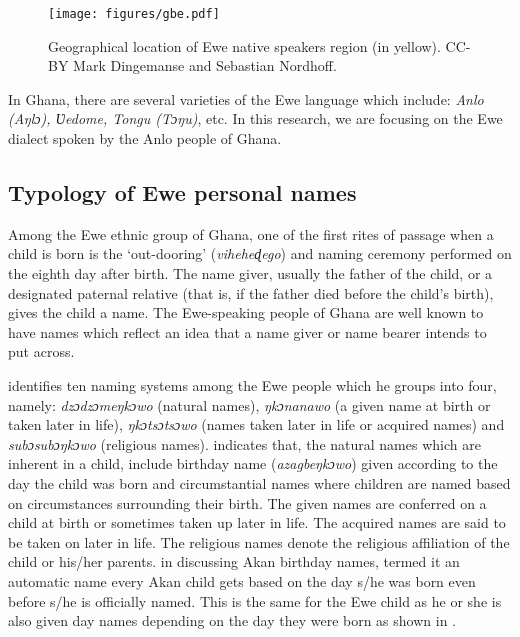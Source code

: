 \documentclass[output=paper]{langscibook}
\begin{document}
\begin{figure}
\texttt{[image: figures/gbe.pdf]}
\caption{Geographical location of Ewe native speakers region (in yellow). CC-BY Mark Dingemanse and Sebastian Nordhoff.}
\end{figure}

In Ghana, there are several varieties of the Ewe language which include: \textit{Anlo (Aŋlɔ), Ʋedome, Tongu (Tɔŋu)}, etc. In this research, we are focusing on the Ewe dialect spoken by the Anlo people of Ghana.

\subsection{Typology of Ewe personal names}
Among the Ewe ethnic group of Ghana, one of the first rites of passage when a child is born is the `out-dooring' (\textit{viheheɖego}) and naming ceremony performed on the eighth day after birth. The name giver, usually the father of the child, or a designated paternal relative (that is, if the father died before the child’s birth), gives the child a name. The Ewe-speaking people of Ghana are well known to have names which reflect an idea that a name giver or name bearer intends to put across.
 
\citet{Egblewogbe1977Ewe} identifies ten naming systems among the Ewe people which he groups into four, namely: {\textit{dzɔdzɔmeŋkɔwo}} (natural names), {\textit{ŋkɔnanawo}}  (a given name at birth or taken later in life), {\textit{ŋkɔtsɔtsɔwo}} (names taken later in life or acquired names) and {\textit{subɔsubɔŋkɔwo}} (religious names). \citet{abdul2014synchronic} indicates that, the natural names which are inherent in a child, include birthday name ({\textit{azagbeŋkɔwo}}) given according to the day the child was born and circumstantial names where children are named based on circumstances surrounding their birth. The given names are conferred on a child at birth or sometimes taken up later in life. The acquired names are said to be taken on later in life. The religious names denote the religious affiliation of the child or his/her parents. \citet{agyekum2006sociolinguistic} in discussing Akan birthday names, termed it an automatic name every Akan child gets based on the day s/he was born even before s/he is officially named. This is the same for the Ewe child as he or she is also given day names depending on the day they were born as shown in .
\end{document}
